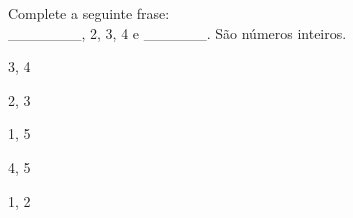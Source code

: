 \question[10]
Complete a seguinte frase:\\
_______, 2, 3, 4 e ______. São números inteiros.
\\
\begin{choices}
\item 3, 4 
\item 2, 3
\item 1, 5 %
\item 4, 5 
\item 1, 2 
\end{choices}
\answerline

